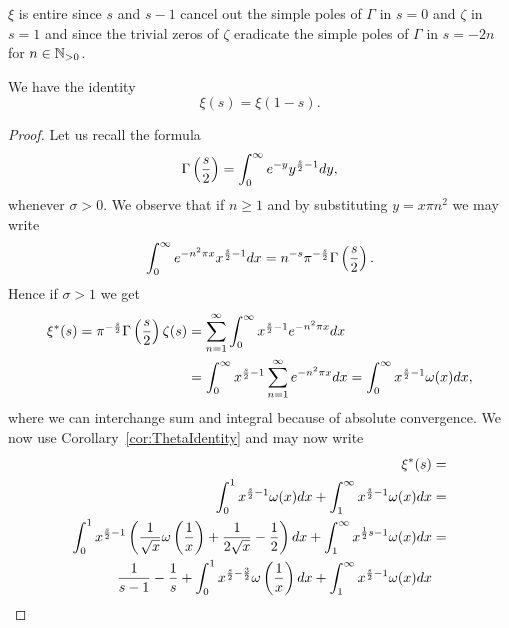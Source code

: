 \begin{remark}
	$\xi$ is entire since $s$ and $s - 1$ cancel out the simple poles of $\Gamma$ in $s = 0$ and $\zeta$ in $s = 1$ and since the trivial zeros of $\zeta$ eradicate the simple poles of $\Gamma$ in $s = -2n$ for $n \in \mathbb{N}_{> 0}$.
\end{remark}


\begin{proposition}\label{pro:XiIdentity}
	We have the identity
\begin{equation*}
	\xi(s) = \xi(1 - s).
\end{equation*}
\end{proposition}
\begin{proof}
	Let us recall the formula
\begin{equation*}
	\Gamma\left(\frac{s}{2}\right) = \int _0 ^\infty e^{-y} y^{\frac{s}{2} - 1} dy,
\end{equation*}	
	whenever $\sigma > 0$. We observe that if $n \geq 1$ and by substituting $y = x \pi n^2$ we may write
\begin{equation*}
	\int _0 ^\infty e^{-n^2 \pi x} x^{\frac{s}{2} - 1} dx = n^{-s} \pi^{-\frac{s}{2}}\Gamma\left(\frac{s}{2}\right).
\end{equation*}
	Hence if $\sigma > 1$ we get
\begin{equation*}
\begin{aligned}
	\xi^*(s) = \pi^{-\frac{s}{2}} \Gamma\left(\frac{s}{2}\right) \zeta(s) 
		&= \sum _{n = 1} ^\infty \int _0 ^\infty x^{\frac{s}{2} - 1} e^{-n^2 \pi x} dx \\
		&= \int _0 ^\infty x^{\frac{s}{2} - 1} \sum _{n = 1} ^\infty e^{-n^2 \pi x} dx
		= \int _0 ^\infty x^{\frac{s}{2} - 1} \omega(x) dx,
\end{aligned}
\end{equation*}
	where we can interchange sum and integral because of absolute convergence. We now use Corollary~\ref{cor:ThetaIdentity} and may now write
\begin{equation*}
\begin{aligned}	
	\xi^*(s) 
	&= \\
		\int _0 ^1 x^{\frac{s}{2} - 1} \omega(x) dx  + \int _1 ^\infty x^{\frac{s}{2} - 1} \omega(x) dx &= \\
		\int _0 ^1 x^{\frac{s}{2} - 1} \cbr{\frac{1}{\sqrt{x}} \omega\cbr{\frac{1}{x}} + \frac{1}{2\sqrt{x}} - \frac{1}{2}} dx  + \int _1 ^\infty x^{\frac{1}{2} s - 1} \omega(x) dx 
	&= \\
		\frac{1}{s - 1} - \frac{1}{s} + \int _0 ^1 x^{\frac{s}{2} - \frac{3}{2}} \omega\cbr{\frac{1}{x}} dx + \int _1 ^\infty x^{\frac{s}{2} - 1} \omega(x) dx 

\end{aligned}
\end{equation*}
\end{proof}
